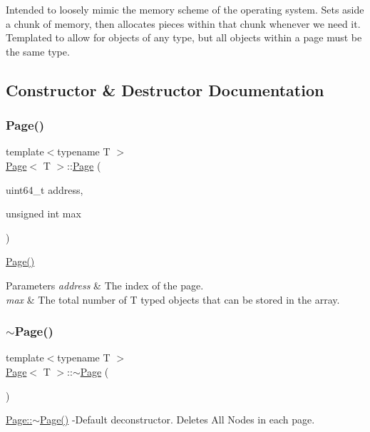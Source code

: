 Intended to loosely mimic the memory scheme of the operating system. Sets aside a chunk of memory, then allocates pieces within that chunk whenever we need it. Templated to allow for objects of any type, but all objects within a page must be the same type. 

\subsection{Constructor \& Destructor Documentation}
\mbox{\label{class_page_ac9e22e2694dfa6a7dc4f80166c0217c5}} 
\subsubsection{\texorpdfstring{Page()}{Page()}}
{\footnotesize\ttfamily template$<$typename T $>$ \\
\hyperlink{class_page}{Page}$<$ T $>$\+::\hyperlink{class_page}{Page} (\begin{DoxyParamCaption}\item[{uint64\+\_\+t}]{address,  }\item[{unsigned int}]{max }\end{DoxyParamCaption})}

\hyperlink{class_page_ac9e22e2694dfa6a7dc4f80166c0217c5}{Page()} 
\begin{DoxyParams}{Parameters}
{\em address} & The index of the page. \\
\hline
{\em max} & The total number of T typed objects that can be stored in the array. \\
\hline
\end{DoxyParams}
\mbox{\label{class_page_a7312a131c7f52718cf4f2b6f487d31bf}} 
\subsubsection{\texorpdfstring{$\sim$\+Page()}{~Page()}}
{\footnotesize\ttfamily template$<$typename T $>$ \\
\hyperlink{class_page}{Page}$<$ T $>$\+::$\sim$\hyperlink{class_page}{Page} (\begin{DoxyParamCaption}{ }\end{DoxyParamCaption})}

\hyperlink{class_page_a7312a131c7f52718cf4f2b6f487d31bf}{Page\+::$\sim$\+Page()} -\/\+Default deconstructor. Deletes All Nodes in each page. 

